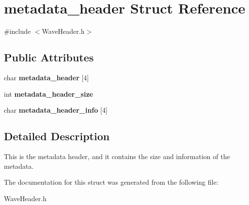 \hypertarget{structmetadata__header}{}\section{metadata\+\_\+header Struct Reference}
\label{structmetadata__header}


{\ttfamily \#include $<$Wave\+Header.\+h$>$}

\subsection*{Public Attributes}
\begin{DoxyCompactItemize}
\item 
\mbox{\label{structmetadata__header_ae79376f0ab4c3ef1be815dc51a4ad479}} 
char {\bfseries metadata\+\_\+header} \mbox{[}4\mbox{]}
\item 
\mbox{\label{structmetadata__header_a9e8db26863ddbec52db57a8c46c87875}} 
int {\bfseries metadata\+\_\+header\+\_\+size}
\item 
\mbox{\label{structmetadata__header_a8660929d9c6b99723f88e1de7d67426a}} 
char {\bfseries metadata\+\_\+header\+\_\+info} \mbox{[}4\mbox{]}
\end{DoxyCompactItemize}


\subsection{Detailed Description}
This is the metadata header, and it contains the size and information of the metadata. 

The documentation for this struct was generated from the following file\+:\begin{DoxyCompactItemize}
\item 
Wave\+Header.\+h\end{DoxyCompactItemize}
